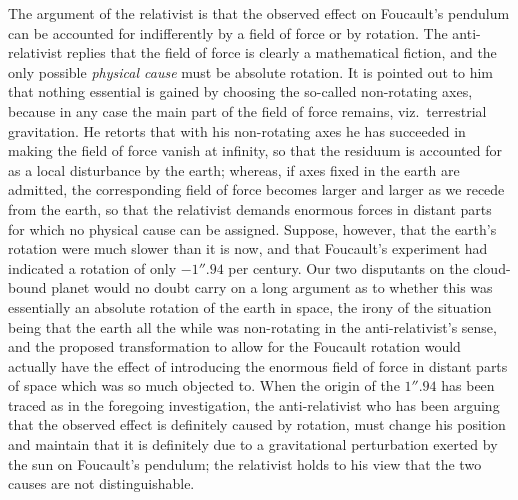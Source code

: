 \documentclass[12pt]{book}
\begin{document}
The argument of the relativist is that the observed effect on Foucault's
pendulum can be accounted for indifferently by a field of force or by rotation.
The anti-relativist replies that the field of force is clearly a mathematical
fiction, and the only possible \emph{physical cause} must be absolute rotation. It is
pointed out to him that nothing essential is gained by choosing the so-called
non-rotating axes, because in any case the main part of the field of force
remains, viz.\ terrestrial gravitation. He retorts that with his non-rotating
axes he has succeeded in making the field of force vanish at infinity, so that
the residuum is accounted for as a local disturbance by the earth; whereas,
if axes fixed in the earth are admitted, the corresponding field of force becomes
larger and larger as we recede from the earth, so that the relativist demands
enormous forces in distant parts for which no physical cause can be assigned.
Suppose, however, that the earth's rotation were much slower than it is now,
and that Foucault's experiment had indicated a rotation of only $-1''.94$ per
century. Our two disputants on the cloud-bound planet would no doubt carry
on a long argument as to whether this was essentially an absolute rotation of
the earth in space, the irony of the situation being that the earth all the while
was non-rotating in the anti-relativist's sense, and the proposed transformation
to allow for the Foucault rotation would actually have the effect of introducing
the enormous field of force in distant parts of space which was so much objected
to. When the origin of the $1''.94$ has been traced as in the foregoing investigation,
the anti-relativist who has been arguing that the observed effect is
definitely caused by rotation, must change his position and maintain that it
is definitely due to a gravitational perturbation exerted by the sun on Foucault's
pendulum; the relativist holds to his view that the two causes are not
distinguishable.

%
\end{document}
